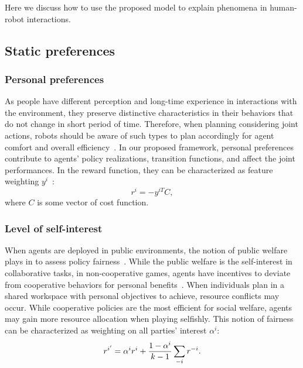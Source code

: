 \documentclass[letterpaper, 10 pt, conference]{ieeeconf}  %
\begin{document}
Here we discuss how to use the proposed model to explain phenomena in human-robot interactions. 
\vspace{-1.3em}
\subsection{Static preferences}
\vspace{-.3em}
\subsubsection{Personal preferences}
As people have different perception and long-time experience in interactions 
with the environment, they preserve distinctive characteristics in their behaviors that 
do not change in short period of time. Therefore, when planning considering joint 
actions, robots should be aware of such types to plan accordingly for agent 
comfort and overall efficiency~\cite{gombolay2015coordination}. In our 
proposed framework, personal preferences contribute to agents' policy 
realizations, transition functions, and affect the joint performances. In the 
reward function, they can be characterized as feature weighting $y^i$~\cite{dorsa2017active}:
\begin{equation}
  r^i = -y^{iT}C, 
\end{equation}
where $C$ is some vector of cost function.
\subsubsection{Level of self-interest}
When agents are deployed in public environments, the notion of public welfare 
plays in to assess policy fairness~\cite{fehr2004social}. While the public welfare is the 
self-interest in collaborative tasks, in non-cooperative games, agents have incentives to 
deviate from cooperative behaviors for personal benefits~\cite{fujiwara2015non}.  
When individuals plan in a shared workspace with personal objectives to 
achieve, resource conflicts may occur. 
While cooperative policies are the most efficient for social welfare, agents 
may gain more resource allocation when playing selfishly. 
This notion of fairness can be characterized as weighting on all 
parties' interest $\alpha^i$:
\begin{equation}
  r^{i'} = \alpha^ir^i+ \small{\frac{1-\alpha^i}{k-1}}\sum_{-i} r^{-i}.
\end{equation}
\end{document}
